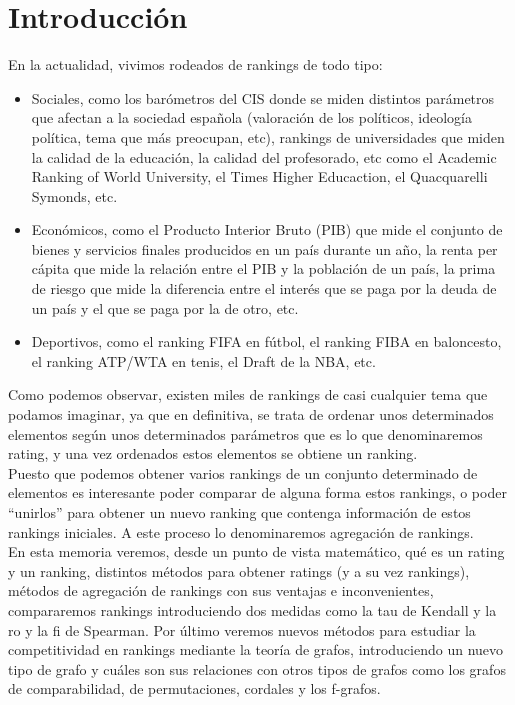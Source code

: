 \chapter{Introducción} \label{chp:introduccion}


En la actualidad, vivimos rodeados de rankings de todo tipo: 
\begin{itemize}
\item Sociales, como los barómetros del CIS donde se miden distintos parámetros que afectan a la sociedad española (valoración de los políticos, ideología política, tema que más preocupan, etc), rankings de universidades que miden la calidad de la educación, la calidad del profesorado, etc como el Academic Ranking of World University, el Times Higher Educaction, el Quacquarelli Symonds, etc.
\item Económicos, como el Producto Interior Bruto (PIB) que mide el conjunto de bienes y servicios finales producidos en un país durante un año, la renta per cápita que mide la relación entre el PIB y la población de un país, la prima de riesgo que mide la diferencia entre el interés que se paga por la deuda de un país y el que se paga por la de otro, etc.
\item Deportivos, como el ranking FIFA en fútbol, el ranking FIBA en baloncesto, el ranking ATP/WTA en tenis, el Draft de la NBA, etc.
\end{itemize}

Como podemos observar, existen miles de rankings de casi cualquier tema que podamos imaginar, ya que en definitiva, se trata de ordenar unos determinados elementos según unos determinados parámetros que es lo que denominaremos rating, y una vez ordenados estos elementos se obtiene un ranking.\\

Puesto que podemos obtener varios rankings de un conjunto determinado de elementos es interesante poder comparar de alguna forma estos rankings, o poder ``unirlos'' para obtener un nuevo ranking que contenga información de estos rankings iniciales. A este proceso lo denominaremos agregación de rankings.\\

En esta memoria veremos, desde un punto de vista matemático, qué es un rating y un ranking, distintos métodos para obtener ratings (y a su vez rankings), métodos de agregación de rankings con sus ventajas e inconvenientes, compararemos rankings introduciendo dos medidas como la tau de Kendall y la ro y la fi de Spearman. Por último veremos nuevos métodos para estudiar la competitividad en rankings mediante la teoría de grafos, introduciendo un nuevo tipo de grafo y cuáles son sus relaciones con otros tipos de grafos como los grafos de comparabilidad, de permutaciones, cordales y los f-grafos.